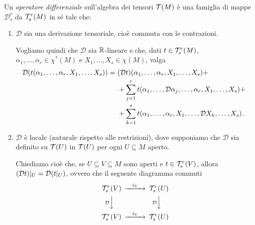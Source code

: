 \begin{definition}  \label{def:OperatoreDifferenziale} %
	Un \emph{operatore differenziale} sull'algebra dei tensori $\mathcal T(M)$ è una famiglia di mappe $\mathcal D_s^r$ da $\mathcal T_s^r(M)$ in sé tale che:
	\begin{enumerate}
	 \item $\mathcal D$ sia una derivazione tensoriale, cioè commuta con le contrazioni. \label{od:Derivazione} %
	 
	 Vogliamo quindi che $\mathcal D$ sia $\mathbb R$-lineare e che, dati $t\in\mathcal T_s^r(M)$, $\alpha_1,\ldots,\alpha_r\in\chi^*(M)$ e $X_1,\ldots,X_s\in\chi(M)$, valga
	 \begin{align*}
	 	\mathcal D (t(\alpha_1,\ldots,\alpha_r,X_1,\ldots,X_s)) =\ & (\mathcal D t) (\alpha_1,\ldots,\alpha_r,X_1,\ldots,X_s) +\\
	 	&+\sum_{j=1}^r t(\alpha_1,\ldots,\mathcal D \alpha_j,\ldots, \alpha_r, X_1,\ldots, X_s) +\\
	 	&+\sum_{k=1}^s t(\alpha_1,\ldots, \alpha_r, X_1,\ldots, \mathcal D X_k,\ldots, X_s) \, \text{. }
	 \end{align*}

	\item $\mathcal D$ è locale (naturale rispetto alle restrizioni), dove supponiamo che $\mathcal D$ sia definito su $\mathcal T(U)$ in $\mathcal T(U)$ per ogni $U\subseteq M$ aperto. \label{od:Restrizioni} %
	
	Chiediamo cioè che, se $U\subseteq V \subseteq M$ sono aperti e $t\in\mathcal T_s^r(V)$, allora $(\mathcal D t)|_ U = \mathcal D (t|_ U)$, ovvero che il seguente diagramma commuti
	\begin{equation*}
	\begin{CD} 
	 \Tau_s^r(V) @>i_U>> \Tau_s^r(U) \\
	 @V\mathcal{D}VV  @V\mathcal{D}VV \\
	 \Tau_s^r(V) @>i_U>> \Tau_s^r(U) 
	\end{CD}
	\end{equation*}

	\end{enumerate}
\end{definition}

